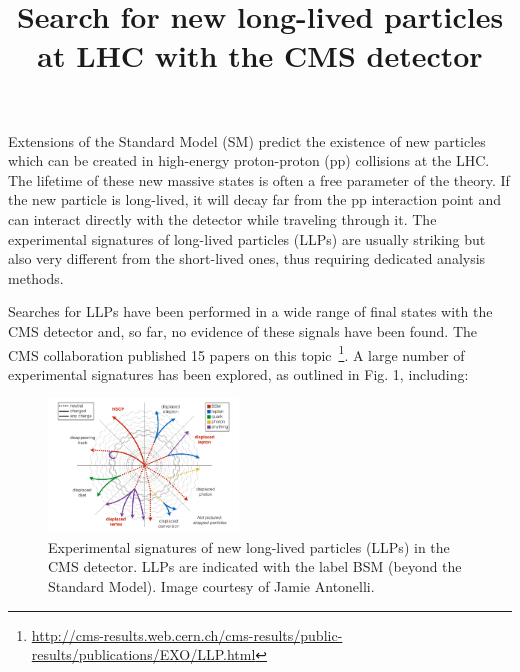 \documentclass[twocolumn,twoside,10pt,nodate]{article}
\newcommand{\titolo}[2]{\title{\Large\bf\vspace{-1cm}#1}}
\begin{document}

\titolo{Search for new long-lived particles at LHC with the CMS detector}

\date{}%
\maketitle
\thispagestyle{fancy} %

Extensions of the Standard Model (SM) predict the existence of new
particles which can be created in high-energy proton-proton (pp) 
collisions at the LHC. The lifetime of these new massive states is
often a free parameter of the theory. 
If the new particle is long-lived, it will decay far from the pp
interaction point and can interact directly with the detector while
traveling through it. The experimental signatures of long-lived
particles (LLPs) are usually striking but also very different from 
the short-lived ones, thus requiring dedicated analysis methods.

Searches for LLPs have been performed in a
wide range of final states with the CMS detector 
and, so far, no evidence of these signals have been found.
The CMS collaboration published 
15 papers on this
topic~\footnote{\url{http://cms-results.web.cern.ch/cms-results/public-results/publications/EXO/LLP.html}}. 
A large number of experimental signatures has been explored, as outlined in Fig. 1, including:

\begin{figure}[h]
\centering
\includegraphics[width=0.45\textwidth,angle=0]{santanastasio_fig1.pdf}
\caption{\small Experimental signatures of new long-lived particles (LLPs) 
in the CMS detector. LLPs are indicated with the label BSM (beyond the
Standard Model). Image courtesy of Jamie Antonelli.} %
\end{figure}
\end{document}
